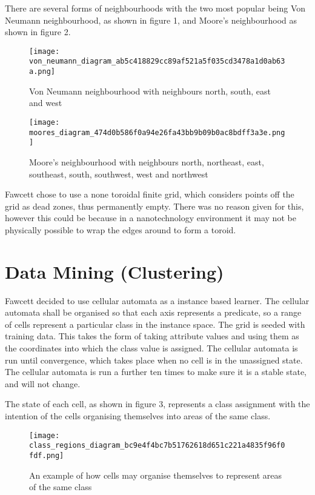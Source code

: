 \documentclass[11pt]{article}
\begin{document}
  There are several forms of neighbourhoods with the two most popular
  being Von Neumann neighbourhood, as shown in figure 1, and Moore's
  neighbourhood as shown in figure 2. 

  

\begin{figure}[htb]
\centering
\texttt{[image: von\_neumann\_diagram\_ab5c418829cc89af521a5f035cd3478a1d0ab63a.png]}
\caption{Von Neumann neighbourhood with neighbours north, south, east and west}
\end{figure}


\begin{figure}[htb]
\centering
\texttt{[image: moores\_diagram\_474d0b586f0a94e26fa43bb9b09b0ac8bdff3a3e.png]}
\caption{Moore's neighbourhood with neighbours north, northeast, east, southeast, south, southwest, west and northwest}
\end{figure}

Fawcett \cite{fawcett08} chose to use a none toroidal finite grid,
which considers points off the grid as dead zones, thus permanently
empty.  There was no reason given for this, however this could be
because in a nanotechnology environment it may not be physically
possible to wrap the edges around to form a toroid.
\section{Data Mining (Clustering)}
\label{sec-3}


  Fawcett \cite{fawcett08} decided to use cellular automata as a
  instance based learner. The cellular automata shall be organised so
  that each axis represents a predicate, so a range of cells represent
  a particular class in the instance space.  The grid is seeded with
  training data.  This takes the form of taking attribute values and
  using them as the coordinates into which the class value is
  assigned.  The cellular automata is run until convergence, which
  takes place when no cell is in the unassigned state.  The cellular
  automata is run a further ten times to make sure it is a stable
  state, and will not change.

  The state of each cell, as shown in figure 3, represents a class
  assignment with the intention of the cells organising themselves
  into areas of the same class.

\begin{figure}[htb]
\centering
\texttt{[image: class\_regions\_diagram\_bc9e4f4bc7b51762618d651c221a4835f96f0fdf.png]}
\caption{An example of how cells may organise themselves to represent areas of the same class}
\end{figure}
\end{document}
